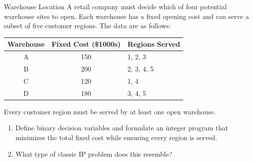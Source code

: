 \begin{ex}{Warehouse Location}{}
\label{ex:warehouse-cover}
 A retail company must decide which of four potential warehouse sites to open. Each warehouse has a fixed opening cost and can serve a subset of five customer regions.  The data are as follows:

\begin{center}
\begin{tabular}{c|c|l}
\textbf{Warehouse} & \textbf{Fixed Cost (\$1000s)} & \textbf{Regions Served} \\
\hline
A & 150 & 1, 2, 3 \\
B & 200 & 2, 3, 4, 5 \\
C & 120 & 1, 4 \\
D & 180 & 3, 4, 5 \\
\end{tabular}
\par{}\label{tab:integerProgrammingFormulations-book1-tab04}%

\end{center}

Every customer region must be served by at least one open warehouse.

\begin{enumerate}
\item Define binary decision variables and formulate an integer program that minimizes the total fixed cost while ensuring every region is served.
\item What type of classic IP problem does this resemble?
\end{enumerate}
\end{ex}

